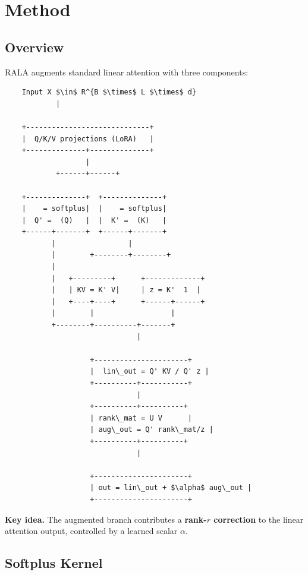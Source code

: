 
\section{Method}

\subsection{Overview}

RALA augments standard linear attention with three components:

\begin{lstlisting}
    Input X $\in$ R^{B $\times$ L $\times$ d}
            |
             
    +-----------------------------+
    |  Q/K/V projections (LoRA)   |
    +--------------+--------------+
                   |
            +------+------+
                           
    +--------------+  +--------------+
    |    = softplus|  |    = softplus|
    |  Q' =  (Q)   |  |  K' =  (K)   |
    +------+-------+  +------+-------+
           |                 |
           |        +--------+--------+
           |                           
           |   +---------+      +-------------+
           |   | KV = K' V|     | z = K'  1  |
           |   +----+----+      +------+------+
           |        |                  |
           +--------+----------+-------+
                               |
                                
                    +----------------------+
                    |  lin\_out = Q' KV / Q' z |
                    +----------+-----------+
                               |
                    +----------+----------+
                    | rank\_mat = U V      |
                    | aug\_out = Q' rank\_mat/z |
                    +----------+----------+
                               |
                                
                    +----------------------+
                    | out = lin\_out + $\alpha$ aug\_out |
                    +----------------------+
\end{lstlisting}

\textbf{Key idea.} The augmented branch contributes a \textbf{rank-$r$ correction} 
to the linear attention output, controlled by a learned scalar $\alpha$.

\subsection{Softplus Kernel}

